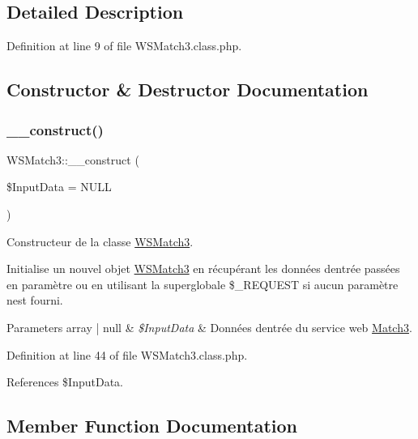 \subsection{Detailed Description}


Definition at line 9 of file W\+S\+Match3.\+class.\+php.



\subsection{Constructor \& Destructor Documentation}
\mbox{\label{class_w_s_match3_a5b15159c3ae0bd42ee40cc318b8b27bc}} 
\subsubsection{\texorpdfstring{\+\_\+\+\_\+construct()}{\_\_construct()}}
{\footnotesize\ttfamily W\+S\+Match3\+::\+\_\+\+\_\+construct (\begin{DoxyParamCaption}\item[{}]{\$\+Input\+Data = {\ttfamily NULL} }\end{DoxyParamCaption})}

Constructeur de la classe \hyperlink{class_w_s_match3}{W\+S\+Match3}.

Initialise un nouvel objet \hyperlink{class_w_s_match3}{W\+S\+Match3} en récupérant les données d\textquotesingle{}entrée passées en paramètre ou en utilisant la superglobale \$\+\_\+\+R\+E\+Q\+U\+E\+ST si aucun paramètre n\textquotesingle{}est fourni.


\begin{DoxyParams}[1]{Parameters}
array | null & {\em \$\+Input\+Data} & Données d\textquotesingle{}entrée du service web \hyperlink{class_match3}{Match3}. \\
\hline
\end{DoxyParams}


Definition at line 44 of file W\+S\+Match3.\+class.\+php.



References \$\+Input\+Data.



\subsection{Member Function Documentation}
\mbox{\label{class_w_s_match3_a16d0c9ff94bf1349edc69fb58a8d0ff1}} 
